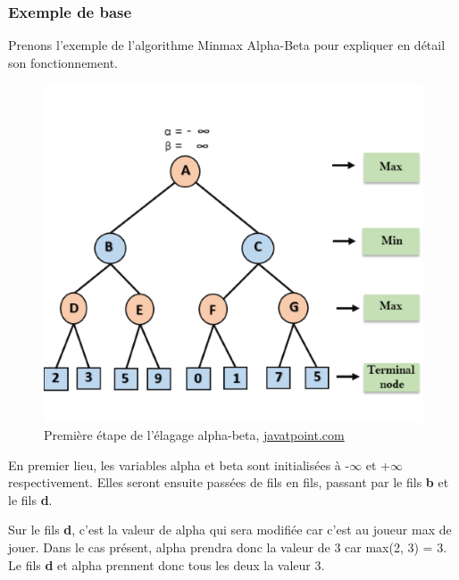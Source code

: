 \huge\documentclass{article}
\begin{document}
\subsubsection{Exemple de base}

Prenons l'exemple de l'algorithme Minmax Alpha-Beta pour expliquer en détail son fonctionnement.



\begin{figure}[!h]
\centering
\includegraphics[scale=0.7]{img/alpha-beta-pruning-step1.png}
\caption{Première étape de l'élagage alpha-beta,
\href{https://www.javatpoint.com/ai-alpha-beta-pruning}{javatpoint.com}}
\end{figure}

En premier lieu, les variables alpha et beta sont initialisées à -$\infty$ et +$\infty$ respectivement. Elles seront ensuite passées de fils en fils, passant par le fils \textbf{b} et le fils \textbf{d}.

Sur le fils \textbf{d}, c'est la valeur de alpha qui sera modifiée car c'est au joueur max de jouer. Dans le cas présent, alpha prendra donc la valeur de 3 car max(2, 3) = 3. Le fils \textbf{d} et alpha prennent donc tous les deux la valeur 3.
\end{document}
